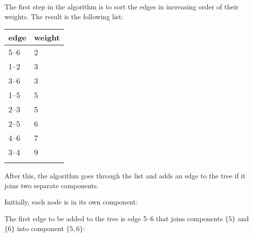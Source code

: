 \begin{samepage}
The first step in the algorithm is to sort the
edges in increasing order of their weights.
The result is the following list:

\begin{tabular}{ll}
\\
edge & weight \\
\hline
5--6 & 2 \\
1--2 & 3 \\
3--6 & 3 \\
1--5 & 5 \\
2--3 & 5 \\
2--5 & 6 \\
4--6 & 7 \\
3--4 & 9 \\
\\
\end{tabular}
\end{samepage}

After this, the algorithm goes through the list
and adds an edge to the tree if it joins
two separate components.

Initially, each node is in its own component:

\begin{center}
\end{center}
The first edge to be added to the tree is
edge 5--6 that joins components
$\{5\}$ and $\{6\}$ into component $\{5,6\}$:

